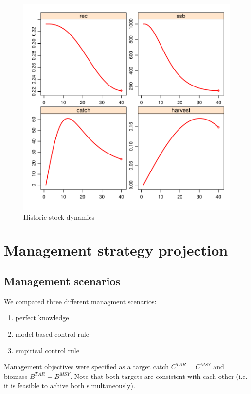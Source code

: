 \documentclass[a4paper]{article}
\begin{document}
\begin{figure}
\centering
\includegraphics{script-hist_proj_plot}
\caption{Historic stock dynamics}
\label{fig:hist_proj}
\end{figure}

\section{Management strategy projection}

\subsection{Management scenarios}

We compared three different managment scenarios:
\begin{enumerate}
\item perfect knowledge
\item model based control rule
\item empirical control rule
\end{enumerate}

Management objectives were specified as a target catch $C^{TAR} = C^{MSY}$ and biomass $B^{TAR} = B^{MSY}$. 
Note that both targets are consistent with each other (i.e. it is feasible to achive both simultaneously).
\end{document}
